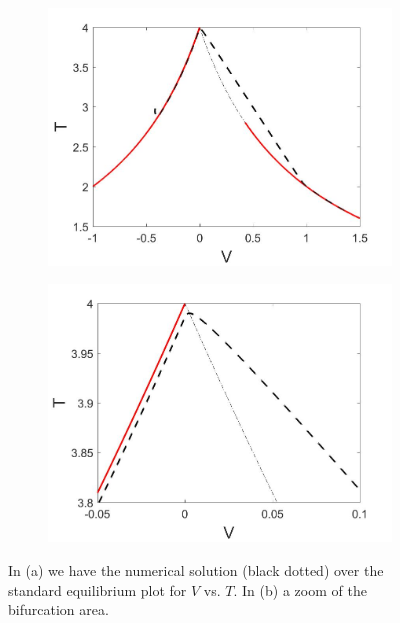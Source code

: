 \begin{figure}[H]
\centering
\begin{subfigure}{.5\textwidth}
 \centering
 \includegraphics[width=\linewidth]{twoD/slow_bif_Tplot.jpg}
 \caption{}
\end{subfigure}%
\begin{subfigure}{.5\textwidth}
 \centering
 \includegraphics[width=\linewidth]{twoD/slow_bif_Tplot_zoom.jpg}
 \caption{}
\end{subfigure}
\caption{In (a) we have the numerical solution (black dotted) over the standard equilibrium plot for $V$ vs. $T$. In (b) a zoom of the bifurcation area.}
\label{fig:twoD_slow_Tnumerics}
\end{figure}


